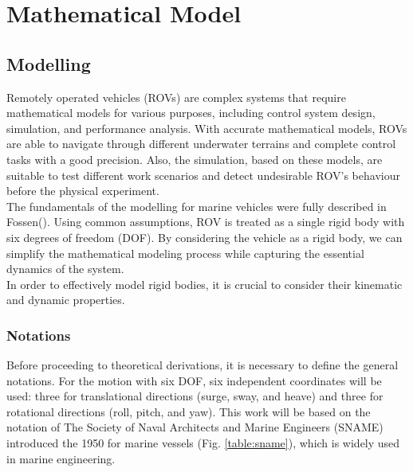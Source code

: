 \chapter{Mathematical Model}
\label{chap:mat}



\section{Modelling}

    Remotely operated vehicles (ROVs) are complex systems that require mathematical models for various purposes, 
    including control system design, simulation, and performance analysis. With accurate mathematical models, 
    ROVs are able to navigate through different underwater terrains and complete control tasks with a good 
    precision. Also, the simulation, based on these models, are suitable to test different work scenarios and 
    detect undesirable ROV's behaviour before the physical experiment. \\    
    
    The fundamentals of the modelling for marine vehicles were fully described in Fossen().
    Using common assumptions, ROV is treated as a single rigid body with six degrees of freedom (DOF).
    By considering the vehicle as a rigid body, we can simplify the mathematical modeling process while capturing the essential dynamics 
    of the system. \\

    In order to effectively model rigid bodies, it is crucial to consider their kinematic and dynamic properties.\\

    \subsection{Notations}


    Before proceeding to theoretical derivations, it is necessary to define the general notations.
    For the motion with six DOF, six independent coordinates will be used: 
    three for translational directions (surge, sway, and heave) and three for rotational directions 
    (roll, pitch, and yaw).
    This work will be based on the notation of The Society of Naval Architects and Marine Engineers (SNAME)
     introduced the 1950 for marine vessels (Fig. \ref{table:sname}), 
    which is widely used in marine engineering.

